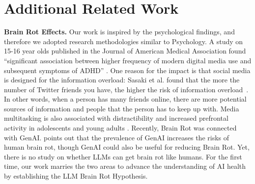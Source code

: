 \section{Additional Related Work}

\textbf{Brain Rot Effects.}
Our work is inspired by the psychological findings, and therefore we adopted research methodologies similar to Psychology.
A study on 15-16 year olds published in the Journal of American Medical Association found “significant association between higher frequency of modern digital media use and subsequent symptoms of ADHD” \citep{ra2018association}.
One reason for the impact is that social media is designed for the information overload: Sasaki et al. found that the more the number of Twitter friends you have, the higher the risk of information overload~\citep{sasaki2015anatomy}. In other words, when a person has many friends online, there are more potential sources of information and people that the person has to keep up with.
Media multitasking is also associated with distractibility and increased prefrontal activity in adolescents and young adults \citep{moisala2016media}.
Recently, Brain Rot was connected with GenAI. \cite{eliot2024brainrot} points out that the prevalence of GenAI increases the risks of human brain rot, though GenAI could also be useful for reducing Brain Rot.
Yet, there is no study on whether LLMs can get brain rot like humans. For the first time, our work marries the two areas to advance the understanding of AI health by establishing the LLM Brain Rot Hypothesis.
